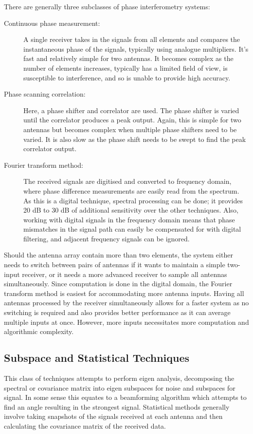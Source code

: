 There are generally three subclasses of phase interferometry systems\cite{jenkins1991smallaperture}:
\begin{description}
  \item [Continuous phase measurement:] A single receiver takes in the signals from all elements and compares the instantaneous phase of the signals, typically using analogue multipliers. It's fast and relatively simple for two antennas. It becomes complex as the number of elements increases, typically has a limited field of view, is susceptible to interference, and so is unable to provide high accuracy.
  \item [Phase scanning correlation:] Here, a phase shifter and correlator are used. The phase shifter is varied until the correlator produces a peak output. Again, this is simple for two antennas but becomes complex when multiple phase shifters need to be varied. It is also slow as the phase shift needs to be swept to find the peak correlator output.
  \item [Fourier transform method:] The received signals are digitised and converted to frequency domain, where phase difference measurements are easily read from the spectrum. As this is a digital technique, spectral processing can be done; it provides 20 dB to 30 dB of additional sensitivity over the other techniques. Also, working with digital signals in the frequency domain means that phase mismatches in the signal path can easily be compensated for with digital filtering, and adjacent frequency signals can be ignored.
\end{description}
Should the antenna array contain more than two elements, the system either needs to switch between pairs of antennas if it wants to maintain a simple two-input receiver, or it needs a more advanced receiver to sample all antennas simultaneously. Since computation is done in the digital domain, the Fourier transform method is easiest for accommodating more antenna inputs. Having all antennas processed by the receiver simultaneously allows for a faster system as no switching is required and also provides better performance as it can average multiple inputs at once. However, more inputs necessitates more computation and algorithmic complexity.

\subsection{Subspace and Statistical Techniques}
This class of techniques attempts to perform eigen analysis, decomposing the spectral or covariance matrix into eigen subspaces for noise and subspaces for signal. In some sense this equates to a beamforming algorithm which attempts to find an angle resulting in the strongest signal. 
Statistical methods generally involve taking snapshots of the signals received at each antenna and then calculating the covariance matrix of the received data\cite{poisel2012electronic}.

